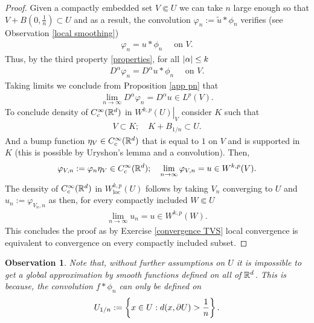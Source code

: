 \documentclass[12pt]{article}
\newtheorem{observation}{Observation}
\theoremstyle{remark}
\newcommand{\qt}[1]{\left(#1\right)}
\newcommand\restr[2]{\left.#1\right|_{#2}}
\begin{document}
\begin{proof}
	Given a compactly embedded set $V \Subset U$ we can take $n$ large enough so that  $V+  B \qt{0, \frac{1}{n}} \subset U$ and as a result, the convolution  $\varphi_n:= \tilde{u} * \phi_n$  verifies (see Observation \ref{local smoothing})
	\begin{align*}
		\varphi_n= u* \phi_n \quad  \text{ on  } V .
	\end{align*}
	Thus, by the third property \ref{properties}, for all $\left| \alpha \right| \leq k $
	\begin{align*}
		D^\alpha \varphi_n = D^\alpha u * \phi_n \quad \text{ on } V.
	\end{align*}
	Taking limits we conclude from Proposition \ref{app pn} that
	\begin{align*}
		\lim_{n \to \infty}D^\alpha \varphi_n =D^\alpha u \in L^p(V) .
	\end{align*}
	To conclude density of $C_c^\infty(\mathbb{R}^d)$ in $\restr{W^{k,p}(U)}{V}$  consider $K$ such that
	\begin{align*}
		V \subset K; \quad  K+ B_{1 /n}\subset U.
	\end{align*}
	And a bump function $\eta_V \in C_c^\infty(\mathbb{R}^d)$ that is equal to $1$ on  $V$ and is supported in $K$ (this is possible by Uryshon's lemma and a convolution). Then,
	\begin{align*}
		\varphi_{V,n}:= \varphi_n \eta _V \in C_c^\infty(\mathbb{R}^d); \quad \lim_{n \to \infty}\varphi_{V,n}=u \in W^{k,p}(V).
	\end{align*}
	The density of $C_c^\infty(\mathbb{R}^d)$ in  $W^{k,p}_{\mathrm{loc}}(U)$ follows by taking $V_n$ converging to  $U$ and  $u_n:= \varphi_{V_n,n}$ as then, for every compactly included $W \Subset  U$
	\begin{align*}
		\lim_{n \to \infty}u_{n}=u \in W^{k,p}(W) .
	\end{align*}
	This concludes the proof as by Exercise \ref{convergence TVS} local convergence is equivalent to convergence on every compactly included subset.
\end{proof}
\begin{observation}
	Note that, without further assumptions on $U$ it is impossible to get a global approximation by smooth functions defined on all of $\mathbb{R}^d$. This is because, the convolution $f* \phi_n$ can only be defined on
	\begin{align*}
		U_{1/n}:= \left\{x \in U: d(x,\partial U)> \frac{1}{n}\right\} .
	\end{align*}
\end{observation}
\end{document}
